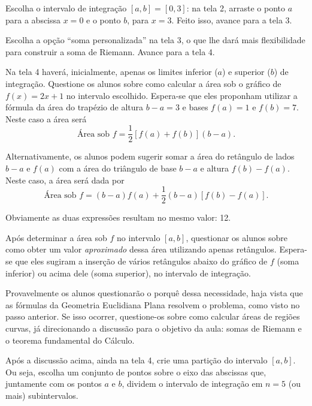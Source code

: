 \documentclass[a4paper,12pt]{scrartcl}
\begin{document}
\begin{list}{.}
      \item Escolha o intervalo de integração $[a,b]=[0,3]$: na tela 2, arraste o ponto $a$ para a abscissa $x = 0$ e o ponto $b$, para $x = 3$. Feito isso, avance para a tela 3.
      
      \item Escolha a opção ``soma personalizada'' na tela 3, o que lhe dará mais flexibilidade para construir a soma de Riemann. Avance para a tela 4.
      
      \item \label{step:area} Na tela 4 haverá, inicialmente, apenas os limites inferior ($a$) e superior ($b$) de integração. Questione os alunos sobre como calcular a área sob o gráfico de $f(x) = 2x + 1$ no intervalo escolhido. Espera-se que eles proponham utilizar a fórmula da área do trapézio de altura $b - a = 3$ e bases $f(a) = 1$ e $f(b) = 7$. Neste caso a área será
      \begin{equation*}
	\text{Área sob $f$} = \frac{1}{2}\left[f(a) + f(b)\right](b - a).
      \end{equation*}
      
      Alternativamente, os alunos podem sugerir somar a área do retângulo de lados $b - a$ e $f(a)$ com a área do triângulo de base $b - a$ e altura $f(b) - f(a)$. Neste caso, a área será dada por
      \begin{equation*}
       \text{Área sob $f$} = (b - a)f(a) + \frac{1}{2}(b - a)\left[f(b) - f(a)\right].
      \end{equation*}
      
      Obviamente as duas expressões resultam no mesmo valor: 12.

      \item Após determinar a área sob $f$ no intervalo $[a,b]$, questionar os alunos sobre como obter um valor \emph{aproximado} dessa área utilizando apenas retângulos. Espera-se que eles sugiram a inserção de vários retângulos abaixo do gráfico de $f$ (soma inferior) ou acima dele (soma superior), no intervalo de integração.
      
      Provavelmente os alunos questionarão o porquê dessa necessidade, haja vista que as fórmulas da Geometria Euclidiana Plana resolvem o problema, como visto no passo anterior. Se isso ocorrer, questione-os sobre como calcular áreas de regiões curvas, já direcionando a discussão para o objetivo da aula: somas de Riemann e o teorema fundamental do Cálculo.
    
      \item Após a discussão acima, ainda na tela 4, crie uma partição do intervalo $[a,b]$. Ou seja, escolha um conjunto de pontos sobre o eixo das abscissas que, juntamente com os pontos $a$ e $b$, dividem o intervalo de integração em $n = 5$ (ou mais) subintervalos. 
      

\end{list}
\end{document}

